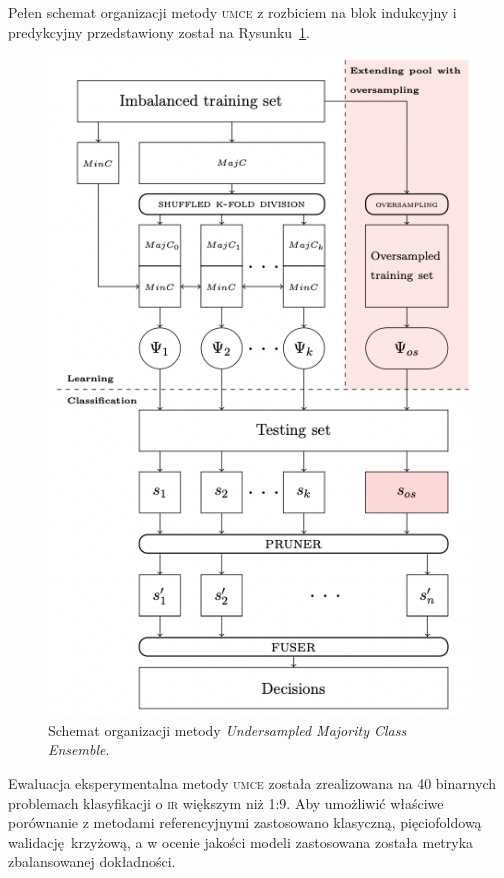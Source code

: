 Pełen schemat organizacji metody \textsc{umce} z rozbiciem na blok indukcyjny i predykcyjny przedstawiony został na Rysunku~\ref{fig:umce}.

\begin{figure}[!htb]
	\centering
	\includegraphics[width=.9\textwidth]{figures/umce}
	\vspace{-1em}
	\caption{Schemat organizacji metody \emph{Undersampled Majority Class Ensemble}.}\label{fig:umce}
\end{figure}

Ewaluacja eksperymentalna metody \textsc{umce} została zrealizowana na 40 binarnych problemach klasyfikacji o \textsc{ir} większym niż 1:9. Aby umożliwić właściwe porównanie z metodami referencyjnymi zastosowano klasyczną, pięciofoldową walidację krzyżową, a w ocenie jakości modeli zastosowana została metryka zbalansowanej dokładności.

